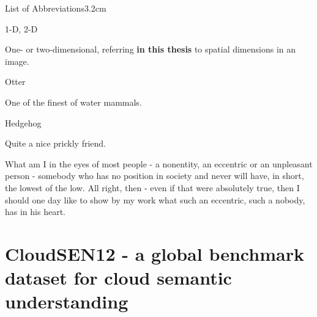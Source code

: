\documentclass[a4paper, nobind]{templates/cdethesis}
\begin{document}
\begin{romanpages}
\listoffigures
	\mtcaddchapter

\listoftables
  \mtcaddchapter
\begin{mclistof}{List of Abbreviations}{3.2cm}

\item[1-D, 2-D]

One- or two-dimensional, referring \textbf{in this thesis} to spatial dimensions in an image.

\item[Otter]

One of the finest of water mammals.

\item[Hedgehog]

Quite a nice prickly friend.

\end{mclistof} 


\end{romanpages}

\flushbottom

\begin{savequote}
What am I in the eyes of most people - a nonentity, an eccentric or an
unpleasant person - somebody who has no position in society and never
will have, in short, the lowest of the low. All right, then - even if
that were absolutely true, then I should one day like to show by my work
what such an eccentric, such a nobody, has in his heart.
\end{savequote}



\hypertarget{cloudsen12---a-global-benchmark-dataset-for-cloud-semantic-understanding}{%
\chapter{CloudSEN12 - a global benchmark dataset for cloud semantic understanding}\label{cloudsen12---a-global-benchmark-dataset-for-cloud-semantic-understanding}}
\end{document}
